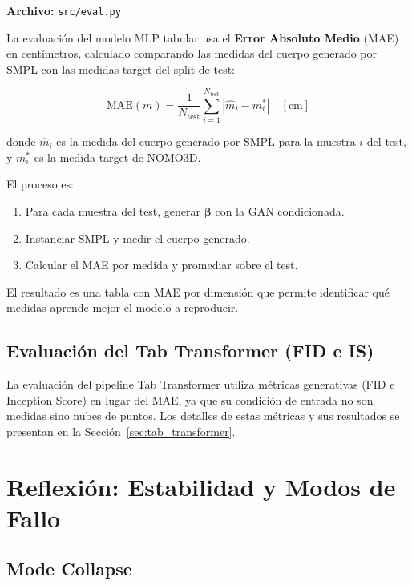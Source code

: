 \documentclass[a4paper,11pt]{article}
\begin{document}
\textbf{Archivo:} \texttt{src/eval.py}

La evaluación del modelo MLP tabular usa el \textbf{Error Absoluto Medio}
(MAE) en centímetros, calculado comparando las medidas del cuerpo generado
por SMPL con las medidas target del split de test:

\begin{equation}
    \label{eq:mae}
    \text{MAE}(m) = \frac{1}{N_{\text{test}}}\sum_{i=1}^{N_{\text{test}}}
    \left|\hat{m}_i - m_i^*\right| \quad [\text{cm}]
\end{equation}

donde $\hat{m}_i$ es la medida del cuerpo generado por SMPL para la muestra
$i$ del test, y $m_i^*$ es la medida target de NOMO3D.

El proceso es:
\begin{enumerate}
    \item Para cada muestra del test, generar $\bm{\beta}$ con la GAN condicionada.
    \item Instanciar SMPL y medir el cuerpo generado.
    \item Calcular el MAE por medida y promediar sobre el test.
\end{enumerate}

El resultado es una tabla con MAE por dimensión que permite identificar qué
medidas aprende mejor el modelo a reproducir.

\subsection{Evaluación del Tab Transformer (FID e IS)}

La evaluación del pipeline Tab Transformer utiliza métricas generativas
(FID e Inception Score) en lugar del MAE, ya que su condición de entrada
no son medidas sino nubes de puntos. Los detalles de estas métricas y sus
resultados se presentan en la Sección~\ref{sec:tab_transformer}.

\section{Reflexión: Estabilidad y Modos de Fallo}

\subsection{Mode Collapse}
\end{document}
